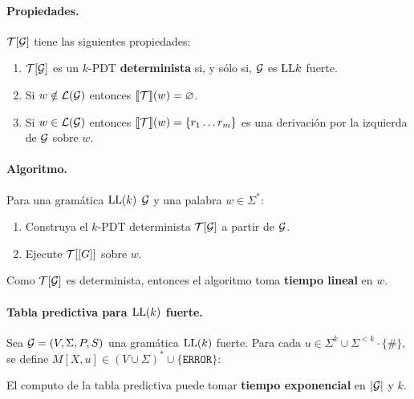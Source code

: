    \paragraph{Propiedades.} $\mathcal{T}[\mathcal{G}]$ tiene las siguientes propiedades:
    \begin{enumerate}
        \item $\mathcal{T}[\mathcal{G}]$ es un $k$-PDT \textbf{determinista} si, y sólo si, $\mathcal{G}$ es $\text{LL}{k}$ fuerte.
        \item Si $w \notin \mathcal{L}(\mathcal{G})$ entonces $\llbracket \mathcal{T} \rrbracket (w) = \varnothing$.
        \item Si $w \in \mathcal{L}(\mathcal{G})$ entonces $\llbracket \mathcal{T} \rrbracket(w) = \{r_1 \ldots r_m\}$ es una derivación por la izquierda de $\mathcal{G}$ sobre $w$.
    \end{enumerate}

    \paragraph{Algoritmo.} Para una gramática $\text{LL}(k)$ $\mathcal{G}$ y una palabra $w \in \Sigma^*$:
    \begin{enumerate}
        \item Construya el $k$-PDT determinista $\mathcal{T}[\mathcal{G}]$ a partir de $\mathcal{G}$.
        \item Ejecute $\mathcal{T}[\mathcal{[}G]]$ sobre $w$.
    \end{enumerate}

    Como $\mathcal{T}[\mathcal{G}]$ es determinista, entonces el algoritmo toma \textbf{tiempo lineal} en $w$.

    \paragraph{Tabla predictiva para $\text{LL}(k)$ fuerte.} Sea $\mathcal{G}=(V,\Sigma, P, S)$ una gramática $\text{LL}(k)$ fuerte. Para cada $u \in \Sigma^k \cup \Sigma^{<k}\cdot \{\#\}$, se define $M[X,u] \in (V\cup \Sigma)^* \cup \{\texttt{ERROR}\}$:

    El computo de la tabla predictiva puede tomar \textbf{tiempo exponencial} en $|\mathcal{G}|$ y $k$.

